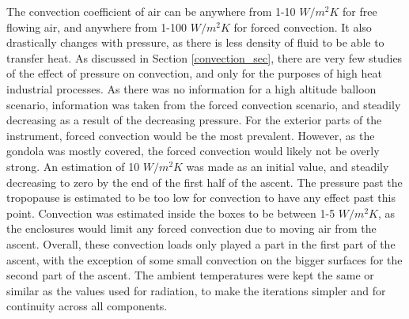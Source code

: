 The convection coefficient of air can be anywhere from 1-10 $W/m^2K$ for free flowing air, and anywhere from 1-100 $W/m^2K$ for forced convection. It also drastically changes with pressure, as there is less density of fluid to be able to transfer heat. As discussed in Section \ref{convection_sec}, there are very few studies of the effect of pressure on convection, and only for the purposes of high heat industrial processes. As there was no information for a high altitude balloon scenario, information was taken from the forced convection scenario, and steadily decreasing as a result of the decreasing pressure. For the exterior parts of the instrument, forced convection would be the most prevalent. However, as the gondola was mostly covered, the forced convection would likely not be overly strong. An estimation of 10 $W/m^2K$ was made as an initial value, and steadily decreasing to zero by the end of the first half of the ascent. The pressure past the tropopause is estimated to be too low for convection to have any effect past this point. Convection was estimated inside the boxes to be between 1-5 $W/m^2K$, as the enclosures would limit any forced convection due to moving air from the ascent. Overall, these convection loads only played a part in the first part of the ascent, with the exception of some small convection on the bigger surfaces for the second part of the ascent. The ambient temperatures were kept the same or similar as the values used for radiation, to make the iterations simpler and for continuity across all components.

